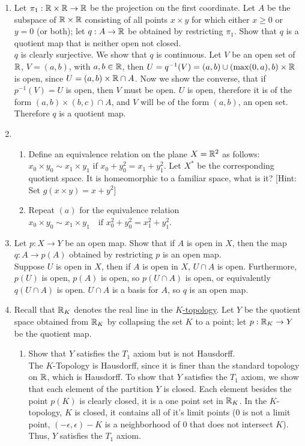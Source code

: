 \documentclass[12pt,letterpaper]{article}
\begin{document}
\begin{enumerate}
\begin{enumerate}
  \end{enumerate}
  \item Let $\pi_1:\mathbb{R}\times\mathbb{R} \rightarrow \mathbb{R}$ be the projection on the first coordinate. Let $A$ be the subspace of $\mathbb{R}\times\mathbb{R}$ consisting of all points $x\times y$ for which either $x\geq 0$ or $y=0$ (or both); let $q: A\rightarrow \mathbb{R}$ be obtained by restricting $\pi_1$. Show that $q$ is a quotient map that is neither open not closed. \\
  $q$ is clearly surjective. We show that $q$ is continuous. Let $V$ be an open set of $\mathbb{R}$, $V=(a,b)$, with $a,b\in\mathbb{R}$, then $U=q^{-1}(V)=(a,b)\cup (\max(0,a),b)\times\mathbb{R}$ is open, since $U=(a,b)\times\mathbb{R} \cap A$. Now we show the converse, that if $p^{-1}(V)=U$ is open, then $V$ must be open. $U$ is open, therefore it is of the form $(a,b)\times(b,c)\cap A$, and $V$ will be of the form $(a,b)$, an open set. Therefore $q$ is a quotient map.
  \item \begin{enumerate}
    \item Define an equivalence relation on the plane $X=\mathbb{R}^2$ as follows: $x_0\times y_0 \sim x_1\times y_1 \text{ if } x_0+y_0^2 = x_1 + y_1^2$. Let $X^*$ be the corresponding quotient space. It is homeomorphic to a familiar space, what is it? [Hint: Set $g(x\times y) = x+y^2$]
    \item Repeat $(a)$ for the equivalence relation $x_0\times y_0 \sim x_1\times y_1 \quad \text{if } x_0^2+y_0^2 = x_1^2 + y_1^2$.
  \end{enumerate}
  \item Let $p: X\rightarrow Y$ be an open map. Show that if $A$ is open in $X$, then the map $q: A\rightarrow p(A)$ obtained by restricting $p$ is an open map.\\
  Suppose $U$ is open in $X$, then if $A$ is open in $X$, $U\cap A$ is open. Furthermore, $p(U)$ is open, $p(A)$ is open, so $p(U\cap A)$ is open, or equivalently $q(U\cap A)$ is open. $U\cap A$ is a basis for $A$, so $q$ is an open map.
  \item Recall that $\mathbb{R}_K$ denotes the real line in the \hyperref[dfn:KTopology]{$K$-topology}. Let $Y$ be the quotient space obtained from $\mathbb{R}_K$ by collapsing the set $K$ to a point; let $p: \mathbb{R}_K\rightarrow Y$ be the quotient map.
  \begin{enumerate}
    \item Show that $Y$ satisfies the $T_1$ axiom but is not Hausdorff. \\
    The $K$-Topology is Hausdorff, since it is finer than the standard topology on $\mathbb{R}$, which is Hausdorff. To show that $Y$ satisfies the $T_1$ axiom, we show that each element of the partition $Y$ is closed. Each element besides the point $p(K)$ is clearly closed, it is a one point set in $\mathbb{R}_K$. In the $K$-topology, $K$ is closed, it contains all of it's limit points ($0$ is not a limit point, $(-\epsilon, \epsilon)-K$ is a neighborhood of $0$ that does not intersect $K$). Thus, $Y$ satisfies the $T_1$ axiom.\\

\end{enumerate}
\end{enumerate}
\end{document}
